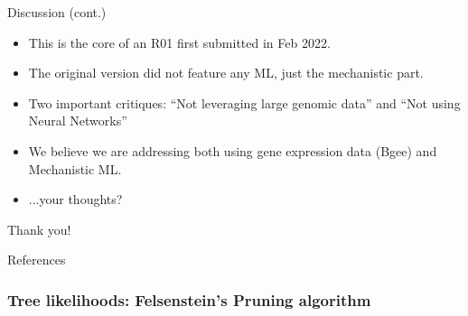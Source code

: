 \documentclass[10pt,aspectratio=169]{beamer}
\newcounter{frame}[frame]
\begin{document}
\begin{frame}{Discussion (cont.)}
    \begin{itemize}[<+->]
        \item This is the core of an R01 first submitted in Feb 2022.
        \item The original version did not feature any ML, just the mechanistic part.
        \item Two important critiques: ``Not leveraging large genomic data'' and ``Not using Neural Networks''
        \item We believe we are addressing both using gene expression data (Bgee) and Mechanistic ML.
        \item ...your thoughts?
    \end{itemize}
\end{frame}

\begin{frame}{}
\begin{center}
    \Large Thank you!
\end{center}
\maketitle
\end{frame}

\appendix

\begin{frame}[allowframebreaks]{References}
    \printbibliography
\end{frame}

\begin{frame}[c]
\frametitle{Tree likelihoods: Felsenstein's Pruning algorithm}
\begin{center}
\end{center}
\vfill\hfill{}
\end{frame}
\end{document}
